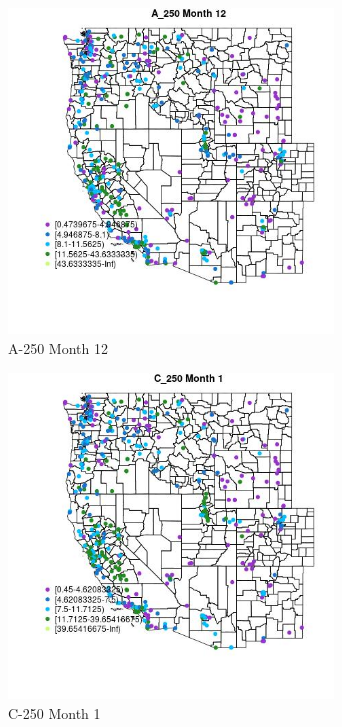 \clearpage 

\begin{figure} 
\centering  
\includegraphics[width=0.77\textwidth]{Code_Outputs/ML_input_report_ML_input_PM25_Step5_part_d_de_duplicated_aves_ML_input_MapObsMo12A_250.jpg} 
\caption{\label{fig:ML_input_report_ML_input_PM25_Step5_part_d_de_duplicated_aves_ML_inputMapObsMo12A_250}A-250 Month 12} 
\end{figure} 
 

\begin{figure} 
\centering  
\includegraphics[width=0.77\textwidth]{Code_Outputs/ML_input_report_ML_input_PM25_Step5_part_d_de_duplicated_aves_ML_input_MapObsMo1C_250.jpg} 
\caption{\label{fig:ML_input_report_ML_input_PM25_Step5_part_d_de_duplicated_aves_ML_inputMapObsMo1C_250}C-250 Month 1} 
\end{figure} 
 

